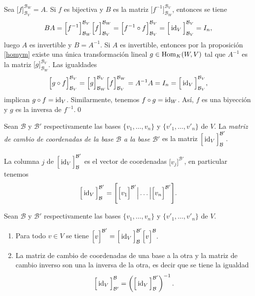 Sea $\Big[ f \Big]^{\mathcal{B}_W}_{\mathcal{B}_V}=A$. Si $f$ es bijectiva y $B$ es la matriz $\Big[ f^{-1} \Big]_{\mathcal{B}_W}^{\mathcal{B}_V}$, entonces se tiene
$$BA=\Big[ f^{-1} \Big]_{\mathcal{B}_W}^{\mathcal{B}_V}\Big[ f \Big]^{\mathcal{B}_W}_{\mathcal{B}_V}= \Big[ f^{-1}\circ f \Big]^{\mathcal{B}_V}_{\mathcal{B}_V}=\Big[\operatorname{id}_V\Big]^{\mathcal{B}_V}_{\mathcal{B}_V}=I_n,$$
luego $A$ es invertible y $B=A^{-1}$. Si $A$ es invertible, entonces por la proposici\'on \ref{homym} existe una \'unica transformaci\'on lineal $g\in \operatorname{Hom}_K(W,V)$ tal que $A^{-1}$ es la matriz $\Big[ g \Big]^{\mathcal{B}_V}_{\mathcal{B}_W}$. Las igualdades
$$\Big[ g\circ f \Big]^{\mathcal{B}_V}_{\mathcal{B}_V}=\Big[ g \Big]^{\mathcal{B}_V}_{\mathcal{B}_W}\Big[ f \Big]^{\mathcal{B}_W}_{\mathcal{B}_V}=A^{-1}A=I_n=\Big[ \operatorname{id}_V \Big]^{\mathcal{B}_V}_{\mathcal{B}_V},$$
implican $g\circ f=\operatorname{id}_V$. Similarmente, tenemos $f\circ g=\operatorname{id}_W$. As\'i, $f$ es una biyecci\'on y $g$ es la inversa de $f^{-1}$.\qed

\begin{defn}
Sean $\mathcal{B}$ y $\mathcal{B}'$ respectivamente las bases $\{v_1,\ldots,v_n\}$ y $\{v'_1,\ldots,v'_n\}$ de $V$. La \emph{matriz de cambio de coordenadas de la base $\mathcal{B}$ a la base $\mathcal{B}'$} es la matriz $\Big[\operatorname{id}_V\Big]^{\mathcal{B}'}_\mathcal{B}$.
\end{defn}

\begin{obs}
La columna $j$ de $\Big[\operatorname{id}_V\Big]^{\mathcal{B}'}_{\mathcal{B}}$ es el vector de coordenadas $\Big[ v_j\Big]^{\mathcal{B}'}$, en particular tenemos
$$\Big[\operatorname{id}_V\Big]^{\mathcal{B}'}_{\mathcal{B}}=\Bigg[\Big[ v_1\Big]^{\mathcal{B}'}\Big|\ldots \Big| \Big[ v_n\Big]^{\mathcal{B}'}\Bigg].$$
\end{obs}

\begin{pro}
Sean $\mathcal{B}$ y $\mathcal{B}'$ respectivamente las bases $\{v_1,\ldots,v_n\}$ y $\{v'_1,\ldots,v'_n\}$ de $V$.
\begin{enumerate}
\item Para todo $v\in V$ se tiene $\Big[v\Big]^{\mathcal{B}'}=\Big[\operatorname{id}_V\Big]^{\mathcal{B}'}_\mathcal{B}\Big[v\Big]^{\mathcal{B}}.$
\item La matriz de cambio de coordenadas de una base a la otra y la matriz de cambio inverso son una la inversa de la otra, es decir que se tiene la igualdad
$$\Big[\operatorname{id}_V\Big]^{\mathcal{B}}_{\mathcal{B}'}=\left(\Big[\operatorname{id}_V\Big]^{\mathcal{B}'}_{\mathcal{B}}\right)^{-1}.$$
\end{enumerate}
\end{pro}

